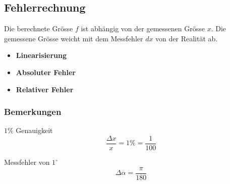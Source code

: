\subsection{Fehlerrechnung}
    Die berechnete Grösse $f$ ist abhängig von der gemessenen Grösse $x$.
    Die gemessene Grösse weicht mit dem Messfehler $dx$ von der Realität ab.
    \begin{itemize}
        \item \textbf{Linearisierung}
            \vspace*{-0.5em}
        \item \textbf{Absoluter Fehler}
            \vspace*{-0.5em}
        \item \textbf{Relativer Fehler}
            \vspace*{-0.5em}
    \end{itemize}
    \subsubsection{Bemerkungen}
        \vspace{0.5em}
        \begin{minipage}{0.54\linewidth}
            \centering \vspace{4pt}
            $1\%$ Genauigkeit
            $$
                \frac{\Delta x}{x} = 1\% = \frac{1}{100}
            $$          
        \end{minipage}
        \begin{minipage}{0.45\linewidth}
            \centering
            Messfehler von $1^\circ$
            $$
                \Delta \alpha = \frac{\pi}{180}
            $$
        \end{minipage}